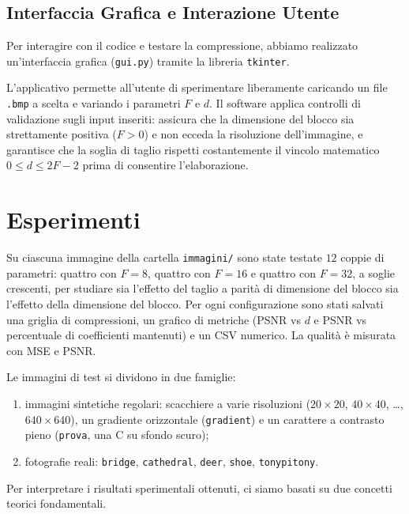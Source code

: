 \documentclass[11pt,a4paper]{article}
\makeatletter
\let\@origtexttt\texttt
\renewcommand{\texttt}[1]{{\def\_{\textunderscore\discretionary{}{}{}}\@origtexttt{#1}}}
\makeatother
\begin{document}
\subsection{Interfaccia Grafica e Interazione Utente}

Per interagire con il codice e testare  la compressione, abbiamo realizzato un'interfaccia grafica (\texttt{gui.py}) tramite la libreria \texttt{tkinter}. 

L'applicativo permette all'utente di sperimentare liberamente caricando un file \texttt{.bmp} a scelta e 
variando i parametri $F$ e $d$. Il software applica controlli di validazione sugli input inseriti: assicura che la 
dimensione del blocco sia strettamente positiva ($F > 0$) e non ecceda la risoluzione dell'immagine, e garantisce che 
la soglia di taglio rispetti costantemente il vincolo matematico $0 \le d \le 2F-2$ prima di consentire l'elaborazione.

\section{Esperimenti}\label{sec:esperimenti}

Su ciascuna immagine della cartella \texttt{immagini/} sono state testate
$12$ coppie di parametri: quattro con $F=8$, quattro con $F=16$ e quattro con
$F=32$, a soglie crescenti, per studiare sia l'effetto del taglio a parità di
dimensione del blocco sia l'effetto della dimensione del blocco. Per ogni
configurazione sono stati salvati una griglia di compressioni, un grafico di
metriche (PSNR vs $d$ e PSNR vs percentuale di coefficienti mantenuti) e un
CSV numerico. La qualità è misurata con MSE e PSNR.

Le immagini di test si dividono in due famiglie:
\begin{enumerate}
  \item immagini sintetiche regolari: scacchiere a varie risoluzioni
        ($20\times20$, $40\times40$, \dots, $640\times640$), un gradiente
        orizzontale (\texttt{gradient}) e un carattere a contrasto pieno
        (\texttt{prova}, una \guillemotleft C\guillemotright{} su sfondo scuro);
  \item fotografie reali: \texttt{bridge}, \texttt{cathedral}, \texttt{deer},
        \texttt{shoe}, \texttt{tonypitony}.
\end{enumerate}


Per interpretare i risultati sperimentali ottenuti, ci siamo basati su due concetti teorici fondamentali. 
\end{document}
